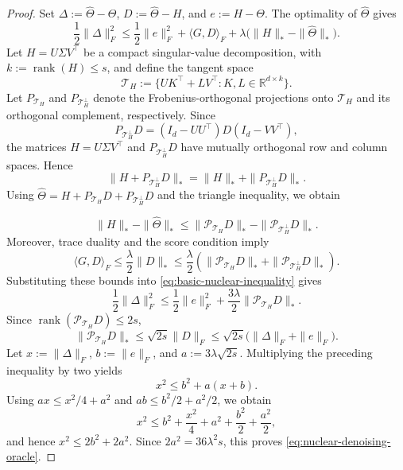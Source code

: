 \documentclass[11pt]{article}
\begin{document}
\begin{proof}
Set $\Delta:=\widehat\Theta-\Theta$, $D:=\widehat\Theta-H$, and
$e:=H-\Theta$. The optimality of $\widehat\Theta$ gives
\begin{equation}
    \frac12\|\Delta\|_F^2
    \leq
    \frac12\|e\|_F^2
    +\langle G,D\rangle_F
    +\lambda\big(\|H\|_*-\|\widehat\Theta\|_*\big).
\label{eq:basic-nuclear-inequality}
\end{equation}
Let $H=U\Sigma V^\top$ be a compact singular-value decomposition, with
$k:=\operatorname{rank}(H)\leq s$, and define the tangent space
\[
    \mathcal T_H
    :=\big\{UK^\top+LV^\top:K,L\in\mathbb R^{d\times k}\big\}.
\]
Let
$P_{\mathcal T_H}$ and $P_{\mathcal T_H^\perp}$ denote the
Frobenius-orthogonal projections onto $\mathcal T_H$ and its orthogonal
complement, respectively. Since
\[
P_{\mathcal T_H^\perp}D
=
(I_d-UU^\top)D(I_d-VV^\top),
\]
the matrices $H=U\Sigma V^\top$ and
$P_{\mathcal T_H^\perp}D$ have mutually orthogonal row and column
spaces. Hence
\[
\|H+P_{\mathcal T_H^\perp}D\|_*
=
\|H\|_*+\|P_{\mathcal T_H^\perp}D\|_*.
\]
Using $\widehat\Theta=H+P_{\mathcal T_H}D+
P_{\mathcal T_H^\perp}D$ and the triangle inequality, we obtain

\begin{equation}
    \|H\|_*-\|\widehat\Theta\|_*
    \leq
    \|\mathcal P_{\mathcal T_H}D\|_*
    -\|\mathcal P_{\mathcal T_H^\perp}D\|_*.
\label{eq:nuclear-decomposability}
\end{equation}
Moreover, trace duality and the score condition imply
\[
    \langle G,D\rangle_F
    \leq\frac\lambda2\|D\|_*
    \leq\frac\lambda2
    \left(
        \|\mathcal P_{\mathcal T_H}D\|_*
        +\|\mathcal P_{\mathcal T_H^\perp}D\|_*
    \right).
\]
Substituting these bounds into \eqref{eq:basic-nuclear-inequality} gives
\[
    \frac12\|\Delta\|_F^2
    \leq
    \frac12\|e\|_F^2
    +\frac{3\lambda}{2}\|\mathcal P_{\mathcal T_H}D\|_*.
\]
Since $\operatorname{rank}(\mathcal P_{\mathcal T_H}D)\leq2s$,
\[
    \|\mathcal P_{\mathcal T_H}D\|_*
    \leq\sqrt{2s}\|D\|_F
    \leq\sqrt{2s}\big(\|\Delta\|_F+\|e\|_F\big).
\]
Let $x:=\|\Delta\|_F$, $b:=\|e\|_F$, and
$a:=3\lambda\sqrt{2s}$. Multiplying the preceding inequality by two yields
\[
    x^2\leq b^2+a(x+b).
\]
Using $ax\leq x^2/4+a^2$ and $ab\leq b^2/2+a^2/2$, we obtain
\[
    x^2\leq b^2+\frac{x^2}{4}+a^2+\frac{b^2}{2}+\frac{a^2}{2},
\]
and hence $x^2\leq2b^2+2a^2$. Since $2a^2=36\lambda^2s$, this proves
\eqref{eq:nuclear-denoising-oracle}.
\end{proof}
\end{document}
